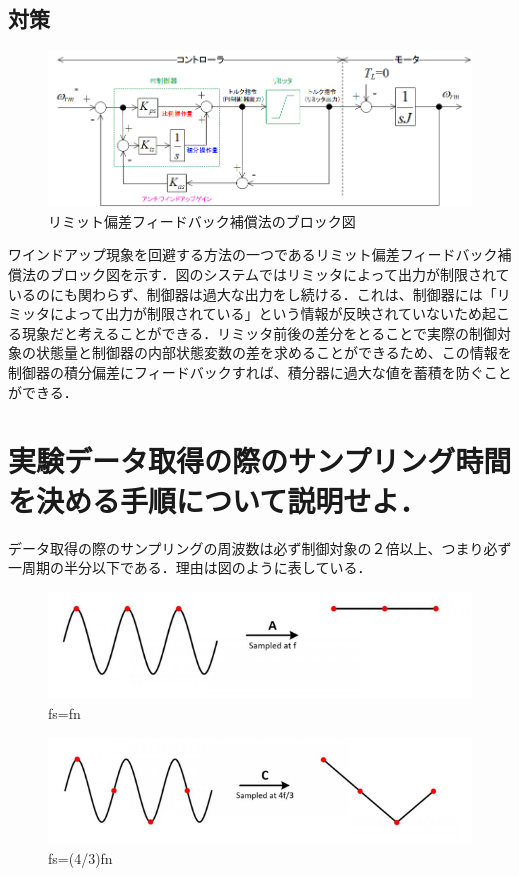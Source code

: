 \documentclass[xelatex,ja=standard,jafont=noto]{bxjsarticle}
\numberwithin{figure}{section}
\begin{document}
\subsection{対策}

\begin{figure}[h!]
    \centering
    \includegraphics[scale=0.6]{015.png}
    \caption{リミット偏差フィードバック補償法のブロック図}
\end{figure}

ワインドアップ現象を回避する方法の一つであるリミット偏差フィードバック補償法のブロック図を示す．図のシステムではリミッタによって出力が制限されているのにも関わらず、制御器は過大な出力をし続ける．これは、制御器には「リミッタによって出力が制限されている」という情報が反映されていないため起こる現象だと考えることができる．リミッタ前後の差分をとることで実際の制御対象の状態量と制御器の内部状態変数の差を求めることができるため、この情報を制御器の積分偏差にフィードバックすれば、積分器に過大な値を蓄積を防ぐことができる．

\section{実験データ取得の際のサンプリング時間を決める手順について説明せよ．}

データ取得の際のサンプリングの周波数は必ず制御対象の２倍以上、つまり必ず一周期の半分以下である．理由は図のように表している．

\begin{figure}[h!]
    \centering
    \includegraphics[scale=0.5]{016.png}
    \caption{fs=fn}
\end{figure}

\begin{figure}[h!]
    \centering
    \includegraphics[scale=0.5]{017.png}
    \caption{fs=(4/3)fn}
\end{figure}
\end{document}
